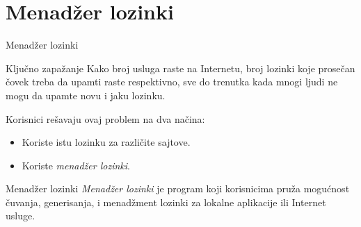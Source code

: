 \documentclass[aspectratio=169,xcolor=dvipsnames]{beamer}
\begin{document}
\section{Menadžer lozinki}

\begin{frame}{Menadžer lozinki}

    \begin{alertblock}{Ključno zapažanje}
        Kako broj usluga raste na Internetu, broj lozinki koje prosečan čovek
        treba da upamti raste respektivno, sve do trenutka kada mnogi ljudi ne
        mogu da upamte novu i jaku lozinku.

        \vspace{1em}

        Korisnici rešavaju ovaj problem na dva načina:
        \begin{itemize}
            \item Koriste istu lozinku za različite sajtove.
            \item Koriste \textit{menadžer lozinki}.
        \end{itemize}
    \end{alertblock}

    \pause

    \begin{block}{Menadžer lozinki}
        \textit{Menadžer lozinki} je program koji korisnicima pruža mogućnost
        čuvanja, generisanja, i menadžment lozinki za lokalne aplikacije ili
        Internet usluge.
    \end{block}

\end{frame}

\end{document}
